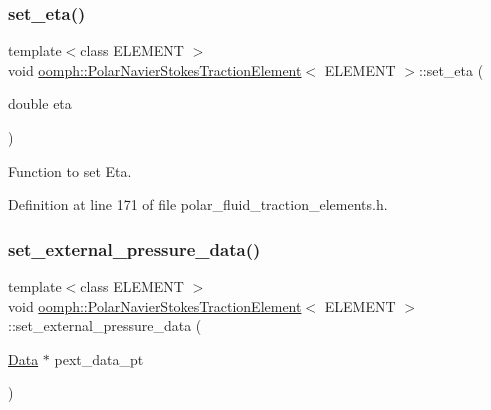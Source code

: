 \subsubsection{\texorpdfstring{set\+\_\+eta()}{set\_eta()}}
{\footnotesize\ttfamily template$<$class E\+L\+E\+M\+E\+NT $>$ \\
void \hyperlink{classoomph_1_1PolarNavierStokesTractionElement}{oomph\+::\+Polar\+Navier\+Stokes\+Traction\+Element}$<$ E\+L\+E\+M\+E\+NT $>$\+::set\+\_\+eta (\begin{DoxyParamCaption}\item[{double}]{eta }\end{DoxyParamCaption})\hspace{0.3cm}{\ttfamily [inline]}}



Function to set Eta. 



Definition at line 171 of file polar\+\_\+fluid\+\_\+traction\+\_\+elements.\+h.

\mbox{\label{classoomph_1_1PolarNavierStokesTractionElement_ac1b44b5788d5f5f54905a011744f6511}} 
\subsubsection{\texorpdfstring{set\+\_\+external\+\_\+pressure\+\_\+data()}{set\_external\_pressure\_data()}}
{\footnotesize\ttfamily template$<$class E\+L\+E\+M\+E\+NT $>$ \\
void \hyperlink{classoomph_1_1PolarNavierStokesTractionElement}{oomph\+::\+Polar\+Navier\+Stokes\+Traction\+Element}$<$ E\+L\+E\+M\+E\+NT $>$\+::set\+\_\+external\+\_\+pressure\+\_\+data (\begin{DoxyParamCaption}\item[{\hyperlink{classoomph_1_1Data}{Data} $\ast$}]{pext\+\_\+data\+\_\+pt }\end{DoxyParamCaption})\hspace{0.3cm}{\ttfamily [inline]}}



